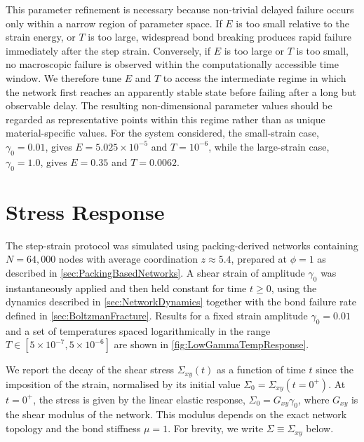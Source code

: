 This parameter refinement is necessary because non-trivial delayed failure occurs only within a narrow region of parameter space. If $E$ is too small relative to the strain energy, or $T$ is too large, widespread bond breaking produces rapid failure immediately after the step strain. Conversely, if $E$ is too large or $T$ is too small, no macroscopic failure is observed within the computationally accessible time window. We therefore tune $E$ and $T$ to access the intermediate regime in which the network first reaches an apparently stable state before failing after a long but observable delay. The resulting non-dimensional parameter values should be regarded as representative points within this regime rather than as unique material-specific values. For the system considered, the small-strain case, $\gamma_0=0.01$, gives $E=5.025\times10^{-5}$ and $T=10^{-6}$, while the large-strain case, $\gamma_0=1.0$, gives $E=0.35$ and $T=0.0062$.

\section{Stress Response} \label{sec:lowStrainResponse}

The step-strain protocol was simulated using packing-derived networks containing $N=64{,}000$ nodes with average coordination $z\approx5.4$, prepared at $\phi=1$ as described in \cref{sec:PackingBasedNetworks}. A shear strain of amplitude $\gamma_0$ was instantaneously applied and then held constant for time $t\geq0$, using the dynamics described in \cref{sec:NetworkDynamics} together with the bond failure rate defined in \cref{sec:BoltzmanFracture}. Results for a fixed strain amplitude $\gamma_0 = 0.01$ and a set of temperatures spaced logarithmically in the range $T \in [5\times10^{-7}, 5\times10^{-6}]$ are shown in \cref{fig:LowGammaTempResponse}.

We report the decay of the shear stress $\Sigma_{xy}(t)$ as a function of time $t$ since the imposition of the strain, normalised by its initial value $\Sigma_0 = \Sigma_{xy}(t=0^+)$. At $t=0^+$, the stress is given by the linear elastic response, $\Sigma_0 = G_{xy}\gamma_0$, where $G_{xy}$ is the shear modulus of the network. This modulus depends on the exact network topology and the bond stiffness $\mu=1$. For brevity, we write $\Sigma \equiv \Sigma_{xy}$ below.

